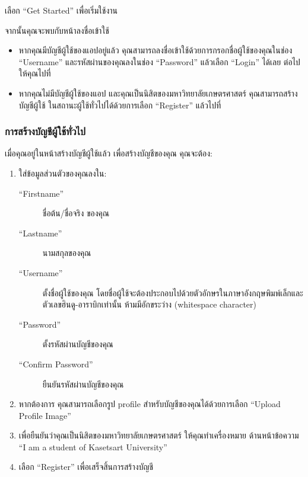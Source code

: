 เลือก ``Get Started'' เพื่อเริ่มใช้งาน

จากนั้นคุณจะพบกับหน้าลงชื่อเข้าใช้


\begin{itemize}
    \item หากคุณมีบัญชีผู้ใช้ของแอปอยู่แล้ว
คุณสามารถลงชื่อเข้าใช้ด้วยการกรอกชื่อผู้ใช้ของคุณในช่อง ``Username'' และรหัสผ่านของคุณลงในช่อง ``Password''
แล้วเลือก ``Login'' ได้เลย ต่อไปให้คุณไปที่~
    \item หากคุณไม่มีบัญชีผู้ใช้ของแอป และคุณเป็นนิสิตของมหาวิทยาลัยเกษตรศาสตร์ คุณสามารถสร้างบัญชีผู้ใช้\relax
ในสถานะผู้ใช้ทั่วไปได้ด้วยการเลือก ``Register'' แล้วไปที่ 
\end{itemize}

\subsubsection{การสร้างบัญชีผู้ใช้ทั่วไป}\label{subsubsec:register-consumer-acct}


เมื่อคุณอยู่ในหน้าสร้างบัญชีผู้ใช้แล้ว เพื่อสร้างบัญชีของคุณ คุณจะต้อง:

\begin{enumerate}
    \item ใส่ข้อมูลส่วนตัวของคุณลงใน:
        \begin{description}
            \item[``Firstname''] ชื่อต้น/ชื่อจริง ของคุณ
            \item[``Lastname''] นามสกุลของคุณ
            \item[``Username''] \parbox[t]{0.5\textwidth}{ตั้งชื่อผู้ใช้ของคุณ โดยชื่อผู้ใช้จะต้องประกอบไปด้วยตัวอักษรในภาษาอังกฤษพิมพ์เล็กและตัวเลขฮินดู-อาราบิกเท่านั้น ห้ามมีอักขระว่าง (whitespace character)}
            \item[``Password''] ตั้งรหัสผ่านบัญชีของคุณ
            \item[``Confirm Password''] ยืนยันรหัสผ่านบัญชีของคุณ
        \end{description}
    \item หากต้องการ คุณสามารถเลือกรูป profile สำหรับบัญชีของคุณได้ด้วยการเลือก ``Upload Profile Image''
    \item เพื่อยืนยันว่าคุณเป็นนิสิตของมหาวิทยาลัยเกษตรศาสตร์ ให้คุณทำเครื่องหมาย \checkmark{} ด้านหน้าข้อความ ``I am a student of Kasetsart University''
    \item เลือก ``Register'' เพื่อเสร็จสิ้นการสร้างบัญชี
\end{enumerate}

